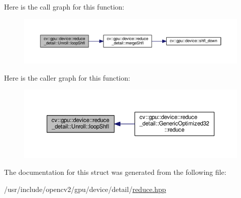 Here is the call graph for this function\-:\nopagebreak
\begin{figure}[H]
\begin{center}
\leavevmode
\includegraphics[width=350pt]{structcv_1_1gpu_1_1device_1_1reduce__detail_1_1Unroll_aa22f16c42584d64c4f2089ccac393f7d_cgraph}
\end{center}
\end{figure}




Here is the caller graph for this function\-:\nopagebreak
\begin{figure}[H]
\begin{center}
\leavevmode
\includegraphics[width=350pt]{structcv_1_1gpu_1_1device_1_1reduce__detail_1_1Unroll_aa22f16c42584d64c4f2089ccac393f7d_icgraph}
\end{center}
\end{figure}




The documentation for this struct was generated from the following file\-:\begin{DoxyCompactItemize}
\item 
/usr/include/opencv2/gpu/device/detail/\hyperlink{detail_2reduce_8hpp}{reduce.\-hpp}\end{DoxyCompactItemize}
